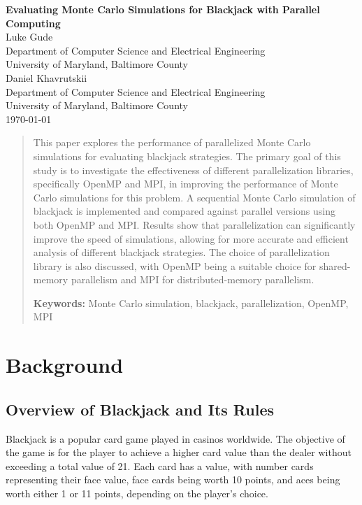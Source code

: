 \documentclass[twocolumn]{report}
\begin{document}
\begin{titlepage}
\begin{center}
    \Large \textbf{Evaluating Monte Carlo Simulations for Blackjack with Parallel Computing}\\[1.5cm]
    \large Luke Gude\\Department of Computer Science and Electrical Engineering\\University of Maryland, Baltimore County\\[1.5cm]
    \large Daniel Khavrutskii\\Department of Computer Science and Electrical Engineering\\University of Maryland, Baltimore County\\[1.5cm]
\vfill
{\large \today}
\end{center}
\end{titlepage}

\begin{abstract}
This paper explores the performance of parallelized Monte Carlo simulations for evaluating blackjack strategies. The primary goal of this study is to investigate the effectiveness of different parallelization libraries, specifically OpenMP and MPI, in improving the performance of Monte Carlo simulations for this problem. A sequential Monte Carlo simulation of blackjack is implemented and compared against parallel versions using both OpenMP and MPI. Results show that parallelization can significantly improve the speed of simulations, allowing for more accurate and efficient analysis of different blackjack strategies. The choice of parallelization library is also discussed, with OpenMP being a suitable choice for shared-memory parallelism and MPI for distributed-memory parallelism.

\textbf{Keywords:} Monte Carlo simulation, blackjack, parallelization, OpenMP, MPI
\end{abstract}

\section{Background}

\subsection{Overview of Blackjack and Its Rules}
Blackjack is a popular card game played in casinos worldwide. The objective of the game is for the player to achieve a higher card value than the dealer without exceeding a total value of 21. Each card has a value, with number cards representing their face value, face cards being worth 10 points, and aces being worth either 1 or 11 points, depending on the player's choice.
\end{document}
